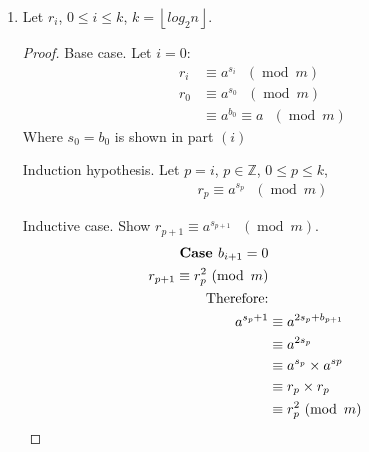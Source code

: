 \documentclass[11pt]{article}
\theoremstyle{definition}
\renewcommand{\pmod}[1]{\mbox{\ $(\ensuremath{\operatorname{mod}}\ {#1})$}}
\newcommand{\Z}{\mathbb{Z}}
\begin{document}
\begin{enumerate}
\begin{enumerate}
\begin{enumerate}
\begin{proof}
          Induction hypothesis. Assume $i = m$, where $m \in \Z$ and $0 \leq m \leq k$:
          \begin{align*}
            s_m &= \sum^{m}_{j = 0} b_j2^{m - j} \\
                &= b_0 + \sum^{m + 1}_{j = 0} b_j 2^{(m + 1) - j}
          \end{align*}

          Inductive case. Assume $i = m + 1$:
          \begin{align*}
            s_{m + 1} = \sum^{m + 1}_{j = 0} b_j 2^{(m + 1) - j} \\
            \text{Left hand side: } \\
            s_{m + 1} = 2s_m + b_{m + 1} \\
            \text{Right hand side: } \\
            \sum^{m + 1}_{j = 0} b_j 2^{(m + 1) - j} &= 2 \times \sum^{m}_{j = 0} b_j 2^{(m - j)} + b_{m + 1} \\
                                                     &= 2s_m + b_{m + 1} \\ \\
            \text{Therefore, } s_i &= \sum^{i}_{j = 0} b_j 2^{i - j}
          \end{align*}
        \end{proof}
      \item
        Let $r_i$, $0 \leq i \leq k$, $k = \left \lfloor{log_2{n}}\right \rfloor$.
        \begin{proof}
          Base case. Let $i = 0$:
          \begin{align*}
            r_i &\equiv a^{s_i} \pmod{m} \\
            r_0 &\equiv a^{s_0} \pmod{m} \\
                &\equiv a^{b_0} \equiv a \pmod{m}
          \end{align*}
          Where $s_0 = b_0$ is shown in part $(i)$

          Induction hypothesis. Let $p = i$, $p \in \Z$, $0 \leq p \leq k$,
          \begin{align*}
            r_p \equiv a^{s_p} \pmod{m}
          \end{align*}

          Inductive case. Show $r_{p + 1} \equiv a^{s_{p + 1}} \pmod{m}$.
          \begin{align*}
            \text{\textbf{Case }} b_{i + 1} = 0 \\
            r_{p + 1} \equiv r^2_p \pmod{m} \\
            \text{Therefore:} \\
            a^{s_p + 1} &\equiv a^{2s_p + b_{p + 1}} \\
                        &\equiv a^{2s_p} \\
                        &\equiv a^{s_p} \times a^{sp} \\
                        &\equiv r_{p} \times r_{p} \\
                        &\equiv r^2_{p} \pmod{m}
          \end{align*}


\end{proof}
\end{enumerate}
\end{enumerate}
\end{enumerate}
\end{document}

